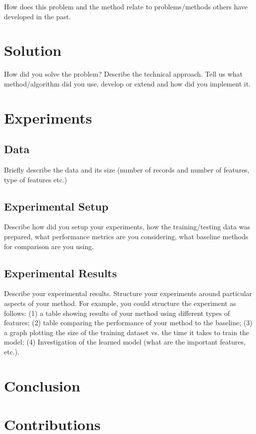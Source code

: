 \documentclass[letterpaper,10pt]{article}
\begin{document}
  How does this problem and the method relate to problems/methods others
  have developed in the past.


  \section{Solution}

  How did you solve the problem? Describe the technical approach. Tell us
  what method/algorithm did you use, develop or extend and how did you
  implement it.


  \section{Experiments}

  \subsection{Data} Briefly describe the data and its size (number of
  records and number of features, type of features etc.)

  \subsection{Experimental Setup} Describe how did you setup your
  experiments, how the training/testing data was prepared, what performance
  metrics are you considering, what baseline methods for comparison are you
  using.

  \subsection{Experimental Results} Describe your experimental results.
  Structure your experiments around particular aspects of your method. For
  example, you could structure the experiment as follows: (1) a table
  showing results of your method using different types of features; (2)
  table comparing the performance of your method to the baseline; (3) a
  graph plotting the size of the training dataset vs. the time it takes to
  train the model; (4) Investigation of the learned model (what are the
  important features, etc.). \cite{santos2009}


  \section{Conclusion}


  \section{Contributions}

  
  

  \clearpage
  
  
\end{document}
